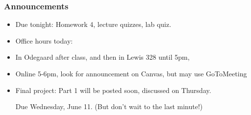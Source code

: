 \documentclass[letterpaper,10pt,english]{sphinxmanual}
\begin{document}
\subsubsection{Announcements}
\label{labs/lab17:announcements}\begin{itemize}
\item {} 
Due tonight: Homework 4, lecture quizzes, lab quiz.

\item {} 
Office hours today:

\end{itemize}
\begin{itemize}
\item {} 
In Odegaard after class, and then in Lewis 328 until 5pm,

\item {} 
Online 5-6pm, look for announcement on Canvas, but may use GoToMeeting

\end{itemize}
\begin{itemize}
\item {} 
Final project:  Part 1 will be posted soon, discussed on Thursday.

Due Wednesday, June 11.  (But don't wait to the last minute!)

\end{itemize}
\end{document}

